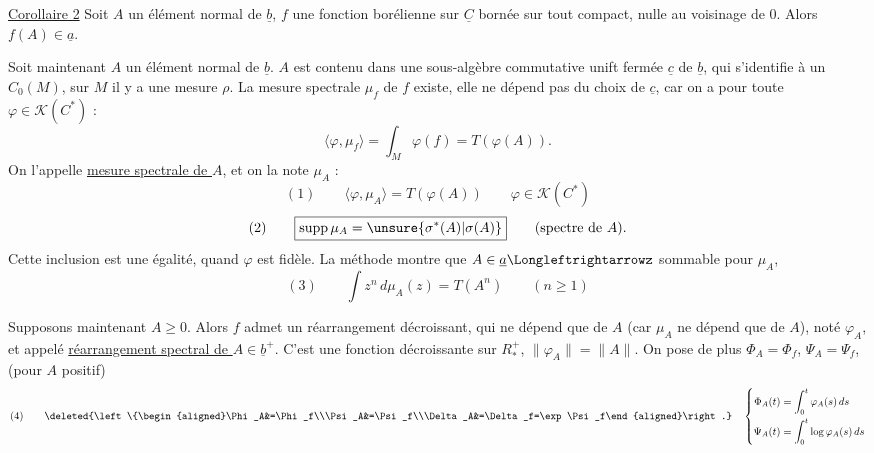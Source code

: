 \uline{Corollaire 2} Soit $A$ un élément normal de $\underline b$, $f$ une fonction borélienne sur $\underline C$ bornée sur tout compact, nulle au voisinage de $0$. Alors $f(A)\in\underline a$.

Soit maintenant $A$ un élément normal de $\underline b$. $A$ est contenu dans une sous-algèbre  commutative unift fermée $\underline c$ de $\underline b$, qui s'identifie à un $C_0(M)$, sur $M$ il y a une mesure $\rho$.  La mesure spectrale $\mu_f$ de $f$ existe, elle ne dépend pas du choix de $\underline c$, car on a pour toute $\varphi\in\mathcal K(C^*)$ :
\[
\langle\varphi,\mu_f\rangle=\int_M\varphi(f)=T(\varphi(A)).
\]
On l'appelle \uline{mesure spectrale de $A$}, et on la note $\mu_A$ :
\[
(1)\qquad\langle\varphi,\mu_A\rangle=T(\varphi(A))\qquad\varphi\in\mathcal K(C^*)
\]
\[
(2)\qquad\boxed{\mathop{\rm supp}\mu_A=\unsure{\sigma^*(A)|\sigma(A)}}\qquad\text{(spectre de $A$).}
\]
Cette inclusion est une égalité, quand $\varphi$ est fidèle. La méthode montre que $A\in\underline a\Longleftrightarrowz$ sommable pour $\mu_A$, 
\[
(3)\qquad\int z^n\,d\mu_A(z)=T(A^n)\qquad(n\geq1)
\]

Supposons maintenant $A\geq0$. Alors  $f$ admet un réarrangement décroissant, qui ne dépend que de $A$ (car $\mu_A$ ne dépend que de $A$), noté $\varphi_A$, et appelé \uline{réarrangement spectral de $A\in\underline b^+$}. C'est une fonction  décroissante sur $R^+_*$, $\|\varphi_A\|=\|A\|$. On pose de plus $\Phi_A=\Phi_f$, $\Psi_A=\Psi_f$, (pour $A$ positif)
\[
(4)\qquad\deleted{\left\{\begin{aligned}\Phi_A&=\Phi_f\\\Psi_A&=\Psi_f\\\Delta_A&=\Delta_f=\exp\Psi_f\end{aligned}\right.}
\quad
\left\{\begin{aligned}\Phi_A(t)&=\int_0^t\varphi_A(s)\,ds\\\Psi_A(t)&=\int_0^t\log\varphi_A(s)\,ds\end{aligned}\right.
\]
